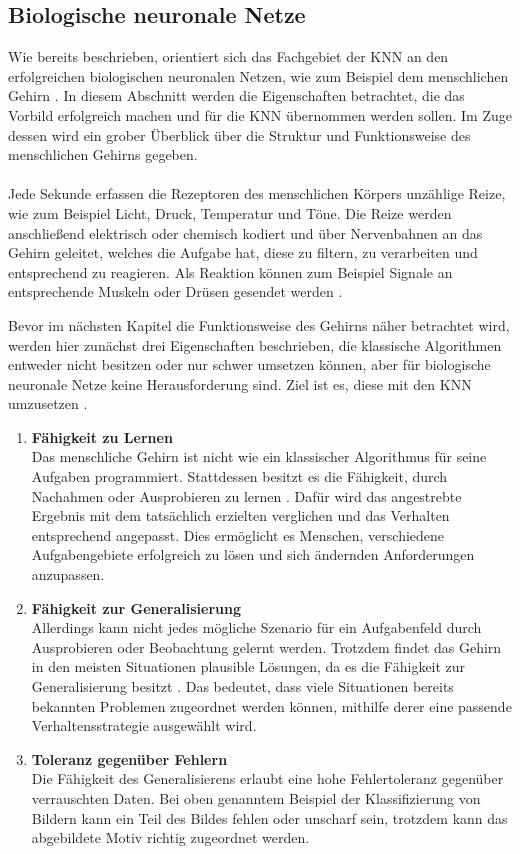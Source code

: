 \subsection{Biologische neuronale Netze}
\label{subsec:biological_neuraL_networks}
Wie bereits beschrieben, orientiert sich das Fachgebiet der \ac{KNN} an den erfolgreichen biologischen neuronalen Netzen, wie zum Beispiel dem menschlichen Gehirn \cite{kriesel2008kleiner}. In diesem Abschnitt werden die Eigenschaften betrachtet, die das Vorbild erfolgreich machen und für die \ac{KNN} übernommen werden sollen. Im Zuge dessen wird ein grober Überblick über die Struktur und Funktionsweise des menschlichen Gehirns gegeben. 
\\\\
Jede Sekunde erfassen die Rezeptoren des menschlichen Körpers unzählige Reize, wie zum Beispiel Licht, Druck, Temperatur und Töne. Die Reize werden anschließend elektrisch oder chemisch kodiert und über Nervenbahnen an das Gehirn geleitet, welches die Aufgabe hat, diese zu filtern, zu verarbeiten und entsprechend zu reagieren. Als Reaktion können zum Beispiel Signale an entsprechende Muskeln oder Drüsen gesendet werden \cite{kinnebrock2018neuronale}. 

Bevor im nächsten Kapitel die Funktionsweise des Gehirns näher betrachtet wird, werden hier zunächst drei Eigenschaften beschrieben, die klassische Algorithmen entweder nicht besitzen oder nur schwer umsetzen können, aber für biologische neuronale Netze keine Herausforderung sind. Ziel ist es, diese mit den \ac{KNN} umzusetzen \cite{kriesel2008kleiner}.
\begin{enumerate}
	\item \textbf{ Fähigkeit zu Lernen} \\
	Das menschliche Gehirn ist nicht wie ein klassischer Algorithmus für seine Aufgaben programmiert. Stattdessen besitzt es die Fähigkeit, durch Nachahmen oder Ausprobieren zu lernen \cite{kriesel2008kleiner}. Dafür wird das angestrebte Ergebnis mit dem tatsächlich erzielten verglichen und das Verhalten entsprechend angepasst. Dies ermöglicht es Menschen, verschiedene Aufgabengebiete erfolgreich zu lösen und sich ändernden Anforderungen anzupassen.
	
	\item \textbf{Fähigkeit zur Generalisierung}\\
	Allerdings kann nicht jedes mögliche Szenario für ein Aufgabenfeld durch Ausprobieren oder Beobachtung gelernt werden. Trotzdem findet das Gehirn in den meisten Situationen plausible Lösungen, da es die Fähigkeit zur Generalisierung besitzt 
	\cite{kriesel2008kleiner}. Das bedeutet, dass viele Situationen bereits bekannten Problemen zugeordnet werden können, mithilfe derer eine passende Verhaltensstrategie ausgewählt wird. 
	
	\item \textbf{Toleranz gegenüber Fehlern}\\
	Die Fähigkeit des Generalisierens erlaubt eine hohe Fehlertoleranz gegenüber verrauschten Daten. Bei oben genanntem Beispiel der Klassifizierung von Bildern kann ein Teil des Bildes fehlen oder unscharf sein, trotzdem kann das abgebildete Motiv richtig zugeordnet werden.
\end{enumerate}

